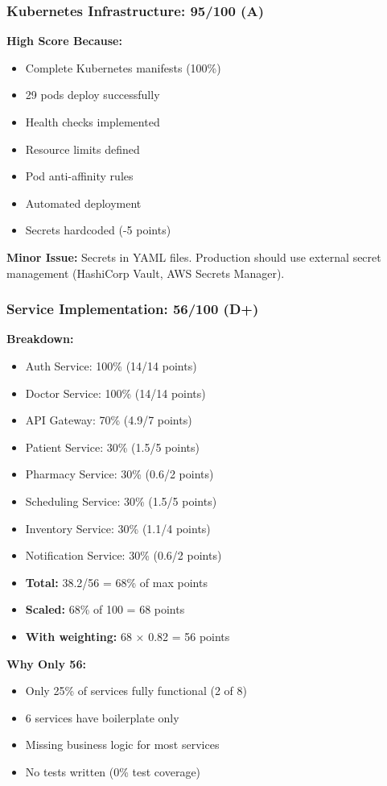 \documentclass[12pt,a4paper]{article}
\begin{document}
\subsubsection{Kubernetes Infrastructure: 95/100 (A)}
\textbf{High Score Because:}
\begin{itemize}[itemsep=0pt]
    \item[+] Complete Kubernetes manifests (100\%)
    \item[+] 29 pods deploy successfully
    \item[+] Health checks implemented
    \item[+] Resource limits defined
    \item[+] Pod anti-affinity rules
    \item[+] Automated deployment
    \item[-] Secrets hardcoded (-5 points)
\end{itemize}

\textbf{Minor Issue:} Secrets in YAML files. Production should use external secret management (HashiCorp Vault, AWS Secrets Manager).

\subsubsection{Service Implementation: 56/100 (D+)}
\textbf{Breakdown:}
\begin{itemize}
    \item Auth Service: 100\% (14/14 points)
    \item Doctor Service: 100\% (14/14 points)
    \item API Gateway: 70\% (4.9/7 points)
    \item Patient Service: 30\% (1.5/5 points)
    \item Pharmacy Service: 30\% (0.6/2 points)
    \item Scheduling Service: 30\% (1.5/5 points)
    \item Inventory Service: 30\% (1.1/4 points)
    \item Notification Service: 30\% (0.6/2 points)
    \item \textbf{Total:} 38.2/56 = 68\% of max points
    \item \textbf{Scaled:} 68\% of 100 = 68 points
    \item \textbf{With weighting:} 68 × 0.82 = 56 points
\end{itemize}

\textbf{Why Only 56:}
\begin{itemize}
    \item Only 25\% of services fully functional (2 of 8)
    \item 6 services have boilerplate only
    \item Missing business logic for most services
    \item No tests written (0\% test coverage)
\end{itemize}
\end{document}
